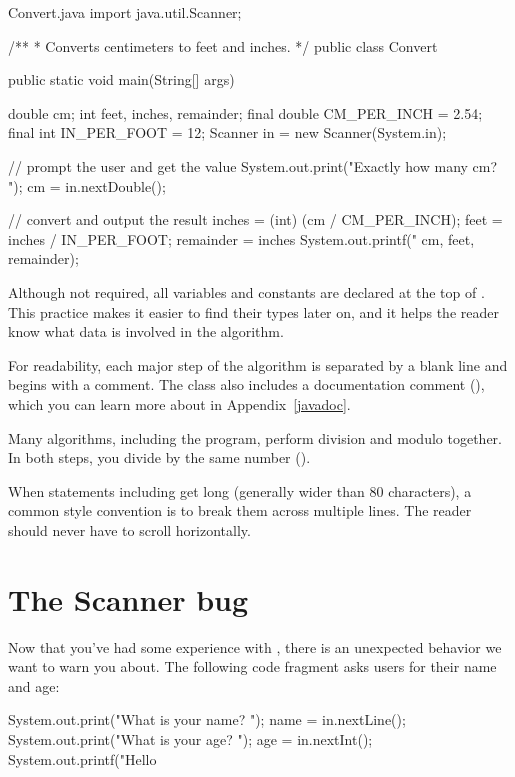 \begin{trinket}{Convert.java}
import java.util.Scanner;

/**
 * Converts centimeters to feet and inches.
 */
public class Convert {

    public static void main(String[] args) {
        double cm;
        int feet, inches, remainder;
        final double CM_PER_INCH = 2.54;
        final int IN_PER_FOOT = 12;
        Scanner in = new Scanner(System.in);

        // prompt the user and get the value
        System.out.print("Exactly how many cm? ");
        cm = in.nextDouble();

        // convert and output the result
        inches = (int) (cm / CM_PER_INCH);
        feet = inches / IN_PER_FOOT;
        remainder = inches %
        System.out.printf("%
                          cm, feet, remainder);
    }
}
\end{trinket}

Although not required, all variables and constants are declared at the top of .
This practice makes it easier to find their types later on, and it helps the reader know what data is involved in the algorithm.


For readability, each major step of the algorithm is separated by a blank line and begins with a comment.
The class also includes a documentation comment (\java{/**}), which you can learn more about in Appendix~\ref{javadoc}.

Many algorithms, including the  program, perform division and modulo together.
In both steps, you divide by the same number ().

When statements including  get long (generally wider than 80 characters), a common style convention is to break them across multiple lines.
The reader should never have to scroll horizontally.


\section{The Scanner bug}
\label{mutablescanner}
Now that you've had some experience with , there is an unexpected behavior we want to warn you about.
The following code fragment asks users for their name and age:

\begin{code}
System.out.print("What is your name? ");
name = in.nextLine();
System.out.print("What is your age? ");
age = in.nextInt();
System.out.printf("Hello %
\end{code}

